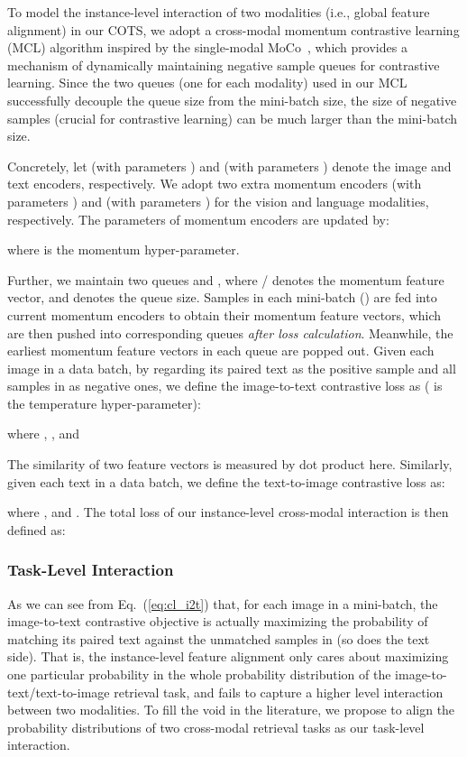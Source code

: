 \documentclass[10pt,twocolumn,letterpaper]{article}
\begin{document}
To model the instance-level interaction of two modalities (i.e., global feature alignment) in our COTS, we adopt a cross-modal momentum contrastive learning (MCL) algorithm inspired by the single-modal MoCo~\cite{he2020momentum}, which provides a mechanism of dynamically maintaining negative sample queues for contrastive learning. Since the two queues (one for each modality) used in our MCL successfully decouple the queue size from the mini-batch size, the size of negative samples (crucial for contrastive learning) can be much larger than the mini-batch size.

Concretely, let  (with parameters ) and  (with parameters ) denote the image and text encoders, respectively. We adopt two extra momentum encoders  (with parameters ) and  (with parameters ) for the vision and language modalities, respectively. The parameters of momentum encoders are updated by:

where  is the momentum hyper-parameter.

Further, we maintain two queues  and , where / denotes the momentum feature vector, and  denotes the queue size. Samples in each mini-batch  () are fed into current momentum encoders to obtain their momentum feature vectors, which are then pushed into corresponding queues \emph{after loss calculation}. Meanwhile, the earliest  momentum feature vectors in each queue are popped out. Given each image in a data batch, by regarding its paired text as the positive sample and all samples in  as negative ones, we define the image-to-text contrastive loss as ( is the temperature hyper-parameter):

where , , and

The similarity of two feature vectors is measured by dot product here. Similarly, given each text in a data batch, we define the text-to-image contrastive loss as:

where , and . The total loss of our instance-level cross-modal interaction is then defined as:


\subsubsection{Task-Level Interaction}

As we can see from Eq.~(\ref{eq:cl_i2t}) that, for each image  in a mini-batch, the image-to-text contrastive objective is actually maximizing the probability of matching its paired text  against the unmatched samples in  (so does the text side). That is, the instance-level feature alignment only cares about maximizing one particular probability in the whole probability distribution of the image-to-text/text-to-image retrieval task, and fails to capture a higher level interaction between two modalities. To fill the void in the literature, we propose to align the probability distributions of two cross-modal retrieval tasks as our task-level interaction.
\end{document}
